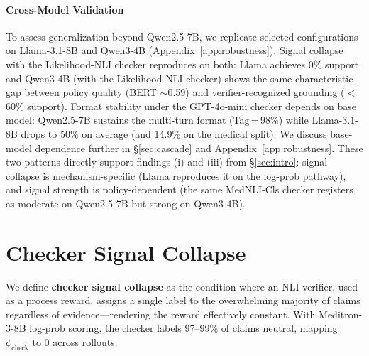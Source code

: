 \documentclass[11pt]{article}
\begin{document}
\paragraph{Cross-Model Validation}
\label{sec:cross_model_validation}
To assess generalization beyond Qwen2.5-7B, we 
replicate selected configurations on Llama-3.1-8B and 
Qwen3-4B (Appendix~\ref{app:robustness}). 
Signal collapse with the Likelihood-NLI checker 
reproduces on both: Llama achieves 0\% support and 
Qwen3-4B (with the Likelihood-NLI checker) shows the 
same characteristic gap between policy quality 
(BERT $\sim$0.59) and verifier-recognized grounding 
($<$60\% support). Format stability under the GPT-4o-mini checker depends on base model: Qwen2.5-7B sustains the multi-turn format  (Tag\,=\,98\%) while Llama-3.1-8B drops to 50\% on average (and 14.9\% on the medical split). We discuss base-model dependence further in  \S\ref{sec:cascade} and Appendix~\ref{app:robustness}. These two patterns directly support findings 
(i) and (iii) from \S\ref{sec:intro}: signal 
collapse is mechanism-specific (Llama reproduces 
it on the log-prob pathway), and signal strength 
is policy-dependent (the same MedNLI-Cls checker 
registers as moderate on Qwen2.5-7B but strong on 
Qwen3-4B).
 
 


\section{Checker Signal Collapse}
\label{sec:collapse}

We define \textbf{checker signal collapse} as the condition where an NLI verifier, used as a process reward, assigns a single label to the overwhelming majority of claims regardless of evidence---rendering
the reward effectively constant. With Meditron-3-8B
log-prob scoring, the checker labels 97--99\% of
claims neutral, mapping $\phi_{\text{check}}$ to 0
across rollouts.


\end{document}
